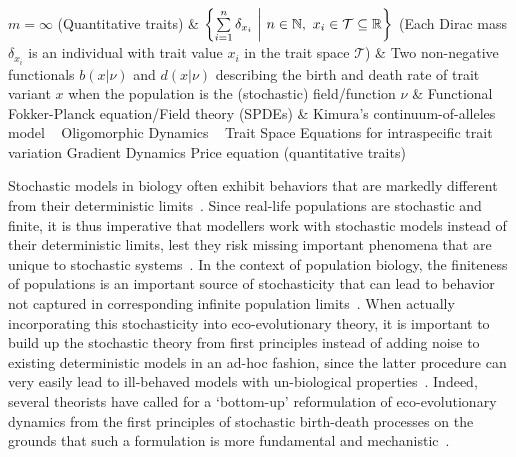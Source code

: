 {\begin{sideways}
\begin{minipage}{\textheight}
{\begin{tabular}
					$m = \infty$ \newline (Quantitative traits) & $ \left\{\sum\limits_{i=1}^{n}\delta_{x_i} \ \bigg{|} \ n \in \mathbb{N}, \ x_i \in \mathcal{T} \subseteq \mathbb{R}\right\}$ \newline \newline (Each Dirac mass $\delta_{x_i}$ is an individual with trait value $x_i$ in the trait space $\mathcal{T}$) & Two non-negative functionals $b(x|\nu)$ and $d(x|\nu)$ describing the birth and death rate of trait variant $x$ when the population is the (stochastic) field/function $\nu$ & Functional Fokker-Planck equation/Field theory \newline (SPDEs) & Kimura's continuum-of-alleles model \newline~ Oligomorphic Dynamics \newline~ Trait Space Equations for intraspecific trait variation \newline Gradient Dynamics \newline Price equation (quantitative traits)\\
					\hline
				\end{tabular}
			}
			\label{table_summary}
		\end{minipage}
	\end{sideways}\par}
\clearpage

Stochastic models in biology often exhibit behaviors that are markedly different from their deterministic limits~\citep{jafarpour_noise-induced_2017,boettiger_noise_2018,jhawar_noise-induced_2020,coomer_noise_2022}. Since real-life populations are stochastic and finite, it is thus imperative that modellers work with stochastic models instead of their deterministic limits, lest they risk missing important phenomena that are unique to stochastic systems~\citep{black_stochastic_2012,hastings_transients_2004,shoemaker_integrating_2020,schreiber_does_2022}. In the context of population biology, the finiteness of populations is an important source of stochasticity that can lead to behavior not captured in corresponding infinite population limits~\citep{black_stochastic_2012,rogers_demographic_2012,debarre_evolutionary_2016,delong_stochasticity_2023}. When actually incorporating this stochasticity into eco-evolutionary theory, it is important to build up the stochastic theory from first principles instead of adding noise to existing deterministic models in an ad-hoc fashion, since the latter procedure can very easily lead to ill-behaved models with un-biological properties~\citep{strang_how_2019}. Indeed, several theorists have called for a `bottom-up' reformulation of eco-evolutionary dynamics from the first principles of stochastic birth-death processes on the grounds that such a formulation is more fundamental and mechanistic~\citep{metcalf_why_2007,lambert_population_2010, geritz_mathematical_2012,doebeli_towards_2017}.

